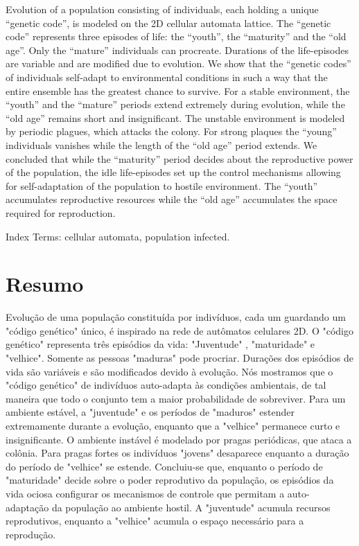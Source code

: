 \documentclass{article}
\begin{document}
Evolution of a population consisting of individuals, each holding a unique “genetic code”, is modeled on the 2D cellular automata lattice. The “genetic code” represents three episodes of life: the “youth”, the “maturity” and the “old age”. Only the “mature” individuals can procreate. Durations of the life-episodes are variable and are modified due to evolution. We show that the “genetic codes” of individuals self-adapt to environmental conditions in such a way that the entire ensemble has the greatest chance to survive. For a stable environment, the “youth” and the “mature” periods extend extremely during evolution, while the “old age” remains short and insignificant. The unstable environment is modeled by periodic plagues, which attacks the colony. For strong plaques the “young” individuals vanishes while the length of the “old age” period extends. We concluded that while the “maturity” period decides about the reproductive power of the population, the idle life-episodes set up the control mechanisms allowing for self-adaptation of the population to hostile environment. The “youth” accumulates reproductive resources while the “old age” accumulates the space required for reproduction.

Index Terms: cellular automata, population infected.


\section{Resumo}

Evolução de uma população constituída por indivíduos, cada um guardando um "código genético" único, é inspirado na rede de autômatos celulares 2D. O "código genético" representa três episódios da vida: "Juventude" , "maturidade" e "velhice". Somente as pessoas "maduras" pode procriar. Durações dos episódios de vida são variáveis e são modificados devido à evolução. Nós mostramos que o "código genético" de indivíduos auto-adapta às condições ambientais, de tal maneira que todo o conjunto tem a maior probabilidade de sobreviver. Para um ambiente estável, a "juventude" e os períodos de "maduros" estender extremamente durante a evolução, enquanto que a "velhice" permanece curto e insignificante. O ambiente instável é modelado por pragas periódicas, que ataca a colônia. Para pragas fortes os indivíduos "jovens" desaparece enquanto a duração do período de "velhice" se estende. Concluiu-se que, enquanto o período de "maturidade" decide sobre o poder reprodutivo da população, os episódios da vida ociosa configurar os mecanismos de controle que permitam a auto- adaptação da população ao ambiente hostil. A "juventude" acumula recursos reprodutivos, enquanto a "velhice" acumula o espaço necessário para a reprodução.
\end{document}
